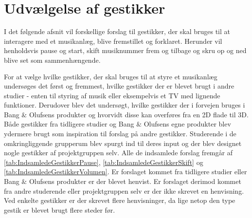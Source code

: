 \section{Udvælgelse af gestikker}
\label{UdvaelgelseAfGestikker}
%
I det følgende afsnit vil forskellige forslag til gestikker, der skal bruges til at interagere med et musikanlæg, blive fremstillet og forklaret. Herunder vil henholdsvis pause og start, skift musiknummer frem og tilbage og skru op og ned blive set som sammenhængende.
 
For at vælge hvilke gestikker, der skal bruges til at styre et musikanlæg undersøges det først og fremmest, hvilke gestikker der er blevet brugt i andre studier - enten til styring af musik eller eksempelvis et TV med lignende funktioner. Derudover blev det undersøgt, hvilke gestikker der i forvejen bruges i Bang $\&$ Olufsens produkter og hvorvidt disse kan overføres fra en 2D flade til 3D. Både gestikker fra tidligere studier og Bang $\&$ Olufsens egne produkter blev ydermere brugt som inspiration til forslag på andre gestikker. Studerende i de omkringliggende grupperum blev spurgt ind til deres input og der blev designet nogle gestikker af projektgruppen selv. Alle de indsamlede forslag fremgår af \autoref{tab:IndsamledeGestikkerPause}, \autoref{tab:IndsamledeGestikkerSkift} og \autoref{tab:IndsamledeGestikkerVolumen}. Er forslaget kommet fra tidligere studier eller Bang $\&$ Olufsens produkter er der blevet henvist. Er forslaget derimod kommet fra andre studerende eller projektgruppen selv er der ikke skrevet en henvisning. Ved enkelte gestikker er der skrevet flere henvisninger, da lige netop den type gestik er blevet brugt flere steder før. 



